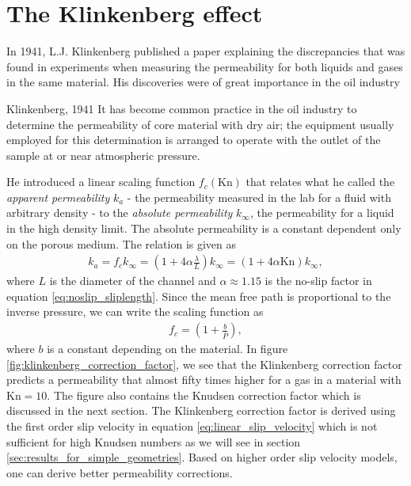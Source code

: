 \section{The Klinkenberg effect}
In 1941, L.J. Klinkenberg published a paper explaining the discrepancies that was found in experiments when measuring the permeability for both liquids and gases in the same material\cite{klinkenberg1941permeability}. His discoveries were of great importance in the oil industry
\begin{aquote}{Klinkenberg, 1941}
	It has become common practice in the oil industry to determine the permeability of core material with dry air; the equipment usually employed for this determination is arranged to operate with the outlet of the sample at or near atmospheric pressure.
\end{aquote}
He introduced a linear scaling function $f_c(\text{Kn})$ that relates what he called the \textit{apparent permeability} $k_a$ - the permeability measured in the lab for a fluid with arbitrary density - to the \textit{absolute permeability} $k_\infty$, the permeability for a liquid in the high density limit. The absolute permeability is a constant dependent only on the porous medium. The relation is given as
\begin{align}
	k_a = f_c k_\infty = \left(1 + 4\alpha\frac{\lambda}{L}\right)k_\infty = \left(1 + 4\alpha\text{Kn}\right)k_\infty,
\end{align}
where $L$ is the diameter of the channel and $\alpha\approx 1.15$ is the no-slip factor in equation \eqref{eq:noslip_sliplength}. Since the mean free path is proportional to the inverse pressure, we can write the scaling function as
\begin{align}
	f_c = \left(1 + \frac{b}{\bar P}\right),
\end{align}
where $b$ is a constant depending on the material. In figure \ref{fig:klinkenberg_correction_factor}, we see that the Klinkenberg correction factor predicts a permeability that almost fifty times higher for a gas in a material with $\text{Kn}=10$. The figure also contains the Knudsen correction factor which is discussed in the next section. The Klinkenberg correction factor is derived using the first order slip velocity in equation \eqref{eq:linear_slip_velocity} which is not sufficient for high Knudsen numbers as we will see in section \ref{sec:results_for_simple_geometries}. Based on higher order slip velocity models, one can derive better permeability corrections. 
